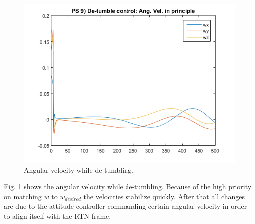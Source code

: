 \documentclass[12pt, letterpaper]{article}
\begin{document}
\begin{figure}[H]
	\centering
	\includegraphics[scale=0.9]{ps9_01}
	\caption{Angular velocity while de-tumbling.}
	\label{9:angvel}
\end{figure}

Fig. \ref{9:angvel} shows the angular velocity while de-tumbling. Because of the high priority on matching $w$ to $w_{desired}$ the velocities stabilize quickly. After that all changes are due to the attitude controller commanding certain angular velocity in order to align itself with the RTN frame.
\end{document}

